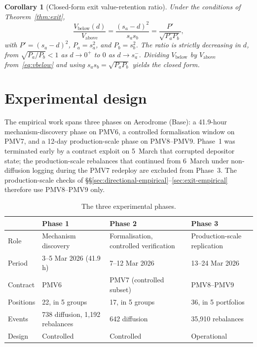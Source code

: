 \documentclass[11pt,a4paper]{article}
\theoremstyle{plain}
\newtheorem{corollary}{Corollary}[theorem]
\begin{document}
\begin{corollary}[Closed-form exit value-retention ratio]\label{cor:exit-ratio}
Under the conditions of Theorem~\ref{thm:exit},
\[
\frac{V_{\text{below}}(d)}{V_{\text{above}}}
=
\frac{(s_a - d)^2}{s_a s_b}
=
\frac{P'}{\sqrt{P_a P_b}},
\]
with $P' = (s_a - d)^2$, $P_a = s_a^2$, and $P_b = s_b^2$. The ratio is strictly decreasing in $d$, from $\sqrt{P_a/P_b} < 1$ as $d \to 0^+$ to $0$ as $d \to s_a^-$. Dividing $V_{\text{below}}$ by $V_{\text{above}}$ from~\eqref{eq:vbelow} and using $s_a s_b = \sqrt{P_a P_b}$ yields the closed form.
\end{corollary}

\section{Experimental design}\label{sec:experimental}

The empirical work spans three phases on Aerodrome (Base): a 41.9-hour mechanism-discovery phase on PMV6, a controlled formalisation window on PMV7, and a 12-day production-scale phase on PMV8--PMV9. Phase~1 was terminated early by a contract exploit on 5~March that corrupted depositor state; the production-scale rebalances that continued from 6~March under non-diffusion logging during the PMV7 redeploy are excluded from Phase~3. The production-scale checks of \S\S\ref{sec:directional-empirical}--\ref{sec:exit-empirical} therefore use PMV8--PMV9 only.

\begin{table}[H]
\centering
\caption{The three experimental phases.}
\label{tab:phases-overview}
\begin{tabularx}{\linewidth}{@{}lYYY@{}}
\toprule
 & Phase 1 & Phase 2 & Phase 3 \\
\midrule
Role      & Mechanism discovery & Formalisation, controlled verification & Production-scale replication \\
Period    & 3--5 Mar 2026 (41.9 h) & 7--12 Mar 2026 & 13--24 Mar 2026 \\
Contract  & PMV6 & PMV7 (controlled subset) & PMV8--PMV9 \\
Positions & 22, in 5 groups & 17, in 5 groups & 36, in 5 portfolios \\
Events    & 738 diffusion, 1{,}192 rebalances & 642 diffusion & 35{,}910 rebalances \\
Design    & Controlled & Controlled & Operational \\
\bottomrule
\end{tabularx}
\end{table}
\end{document}
